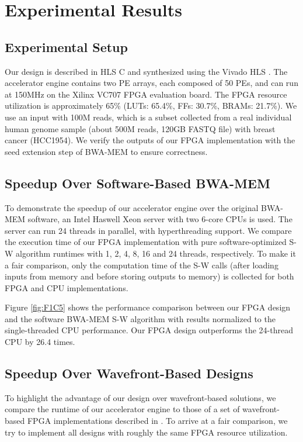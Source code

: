 \section{Experimental Results} 
\label{sec:results}

\subsection{Experimental Setup}

Our design is described in HLS C and synthesized using the Vivado HLS \cite{HLS2011}.
The accelerator engine contains two PE arrays, each composed of 50 PEs, and can run at 150MHz on the Xilinx VC707 FPGA evaluation board.
The FPGA resource utilization is approximately 65\% (LUTs: 65.4\%, FFs: 30.7\%, BRAMs: 21.7\%). 
We use an input with 100M reads, which is a subset collected from a real individual human genome sample (about 500M reads, 120GB FASTQ file) with breast cancer (HCC1954). 
We verify the outputs of our FPGA implementation with the seed extension step of BWA-MEM to ensure correctness. 

\subsection{Speedup Over Software-Based BWA-MEM}

To demonstrate the speedup of our accelerator engine over the original BWA-MEM software, 
an Intel Haswell Xeon server with two 6-core CPUs is used.
The server can run 24 threads in parallel, with hyperthreading support.
We compare the execution time of our FPGA implementation with pure software-optimized S-W algorithm runtimes with 1, 2, 4, 8, 16 and 24 threads, respectively.
To make it a fair comparison, only the computation time of the S-W calls (after loading inputs from memory and before storing outputs to memory) is collected for both FPGA and CPU implementations.

Figure \ref{fig:F1C5} shows the performance comparison between our FPGA design and the software BWA-MEM S-W algorithm with results normalized to the single-threaded CPU performance.
Our FPGA design outperforms the 24-thread CPU by 26.4 times.

\subsection{Speedup Over Wavefront-Based Designs}

To highlight the advantage of our design over wavefront-based solutions, 
we compare the runtime of our accelerator engine to those of a set of wavefront-based FPGA implementations described in \cite{Zhang2007}. To arrive at a fair comparison, we try to implement all designs with roughly the same FPGA resource utilization.

